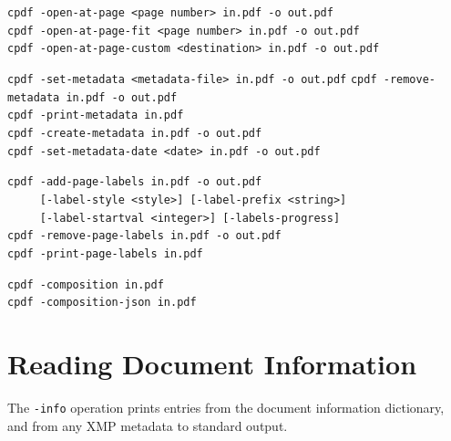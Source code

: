 \documentclass{book}
\begin{document}
\begin{framed}
    \vspace{1.5mm}
    \small\noindent\verb!cpdf -open-at-page <page number> in.pdf -o out.pdf!\\
    \noindent\verb!cpdf -open-at-page-fit <page number> in.pdf -o out.pdf!\\
    \noindent\verb!cpdf -open-at-page-custom <destination> in.pdf -o out.pdf!

    \vspace{1.5mm}
    \small\noindent\verb!cpdf -set-metadata <metadata-file> in.pdf -o out.pdf!
    \small\noindent\verb!cpdf -remove-metadata in.pdf -o out.pdf!\\
    \small\noindent\verb!cpdf -print-metadata in.pdf!\\
    \small\noindent\verb!cpdf -create-metadata in.pdf -o out.pdf!\\
    \small\noindent\verb!cpdf -set-metadata-date <date> in.pdf -o out.pdf!
    
    \vspace{1.5mm}
    \small\noindent\verb!cpdf -add-page-labels in.pdf -o out.pdf!\\
    \noindent\verb!     [-label-style <style>] [-label-prefix <string>]!\\
    \noindent\verb!     [-label-startval <integer>] [-labels-progress]!\\
    
    \vspace{1.5mm}
    \small\noindent\verb!cpdf -remove-page-labels in.pdf -o out.pdf!\\
    \small\noindent\verb!cpdf -print-page-labels in.pdf!

    \vspace{1.5mm}
    \small\noindent\verb!cpdf -composition in.pdf!\\
    \small\noindent\verb!cpdf -composition-json in.pdf!
  \end{framed}
 
\section{Reading Document Information}
\label{info}
The \texttt{-info} operation prints entries from the document information
dictionary, and from any XMP metadata to standard output.
\end{document}
